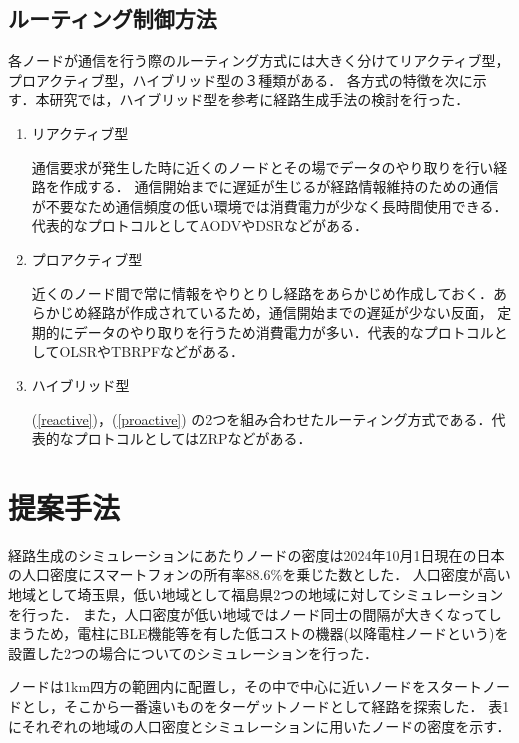 \documentclass[a4paper, 9pt]{ltjsarticle}
\begin{document}
\subsection{ルーティング制御方法} \label{sublabel:routing control}
各ノードが通信を行う際のルーティング方式には大きく分けてリアクティブ型，プロアクティブ型，ハイブリッド型の３種類がある．
各方式の特徴を次に示す．本研究では，ハイブリッド型を参考に経路生成手法の検討を行った．
\begin{enumerate}
  \item \label{reactive} リアクティブ型 \par  
  \indent 通信要求が発生した時に近くのノードとその場でデータのやり取りを行い経路を作成する．
  通信開始までに遅延が生じるが経路情報維持のための通信が不要なため通信頻度の低い環境では消費電力が少なく長時間使用できる．
  代表的なプロトコルとしてAODVやDSRなどがある．

  \item \label{proactive} プロアクティブ型 \par
  \indent 近くのノード間で常に情報をやりとりし経路をあらかじめ作成しておく．あらかじめ経路が作成されているため，通信開始までの遅延が少ない反面，
  定期的にデータのやり取りを行うため消費電力が多い．代表的なプロトコルとしてOLSRやTBRPFなどがある．

  \item ハイブリッド型 \par
  \indent (\ref{reactive})，(\ref{proactive}) の2つを組み合わせたルーティング方式である．代表的なプロトコルとしてはZRPなどがある．
\end{enumerate}

\section{提案手法} \label{label:proposed method}
経路生成のシミュレーションにあたりノードの密度は2024年10月1日現在の日本の人口密度\cite{人口密度}にスマートフォンの所有率88.6\%\cite{スマホ保有率}を乗じた数とした．%
人口密度が高い地域として埼玉県，低い地域として福島県2つの地域に対してシミュレーションを行った．
また，人口密度が低い地域ではノード同士の間隔が大きくなってしまうため，電柱にBLE機能等を有した低コストの機器(以降電柱ノードという)を設置した2つの場合についてのシミュレーションを行った．\par
ノードは1km四方の範囲内に配置し，その中で中心に近いノードをスタートノードとし，そこから一番遠いものをターゲットノードとして経路を探索した．
表1にそれぞれの地域の人口密度とシミュレーションに用いたノードの密度を示す．
\end{document}
